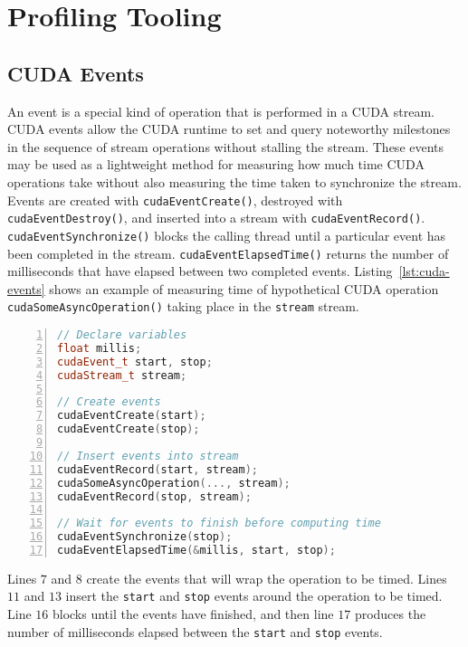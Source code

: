 \section{Profiling Tooling}
\label{sec:profiling}

\subsection{CUDA Events}

An event is a special kind of operation that is performed in a CUDA stream.
CUDA events allow the CUDA runtime to set and query noteworthy milestones in the sequence of stream operations without stalling the stream.
These events may be used as a lightweight method for measuring how much time CUDA operations take without also measuring the time taken to synchronize the stream.
Events are created with \texttt{cudaEventCreate()}, destroyed with \texttt{cudaEventDestroy()}, and inserted into a stream with \texttt{cudaEventRecord()}.
\texttt{cudaEventSynchronize()} blocks the calling thread until a particular event has been completed in the stream.
\texttt{cudaEventElapsedTime()} returns the number of milliseconds that have elapsed between two completed events.
Listing~\ref{lst:cuda-events} shows an example of measuring time of hypothetical CUDA operation \texttt{cudaSomeAsyncOperation()} taking place in the \texttt{stream} stream.

\begin{minipage}{\linewidth}
\begin{lstlisting}[language=C++, caption=Measuring time with CUDA events., label=lst:cuda-events, numbers=left]
// Declare variables
float millis;
cudaEvent_t start, stop;
cudaStream_t stream;

// Create events
cudaEventCreate(start);
cudaEventCreate(stop);

// Insert events into stream
cudaEventRecord(start, stream);
cudaSomeAsyncOperation(..., stream);
cudaEventRecord(stop, stream);

// Wait for events to finish before computing time
cudaEventSynchronize(stop);
cudaEventElapsedTime(&millis, start, stop);
\end{lstlisting}
\end{minipage}

Lines $7$ and $8$ create the events that will wrap the operation to be timed.
Lines $11$ and $13$ insert the \texttt{start} and \texttt{stop} events around the operation to be timed.
Line $16$ blocks until the events have finished, and then line $17$ produces the number of milliseconds elapsed between the \texttt{start} and \texttt{stop} events.

